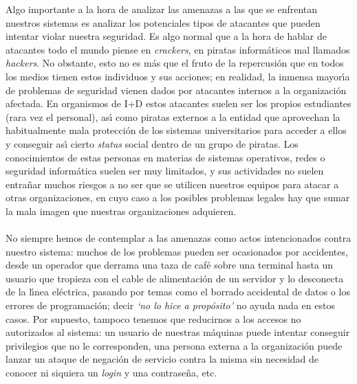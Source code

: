 Algo importante a la hora de analizar las amenazas a las que se enfrentan
nuestros sistemas es analizar los potenciales tipos de atacantes que pueden
intentar violar nuestra seguridad. Es algo normal que a la hora de hablar de
atacantes todo el mundo piense en {\it crackers}, en piratas inform\'aticos mal
llamados {\it hackers}. No obstante, esto no es m\'as que el fruto de la 
repercusi\'on que en todos los medios tienen estos individuos y sus acciones;
en realidad, la inmensa mayor\'{\i}a de problemas de seguridad vienen dados por
atacantes internos a la organizaci\'on afectada. En organismos de I+D estos
atacantes suelen ser los propios estudiantes (rara vez el personal), as\'{\i}
como piratas externos a la entidad que aprovechan la habitualmente mala 
protecci\'on de los sistemas universitarios para acceder a ellos y conseguir
as\'{\i} cierto {\it status} social dentro de un grupo de piratas. Los
conocimientos de estas personas en materias de sistemas operativos, redes o
seguridad inform\'atica suelen ser muy limitados, y sus actividades no suelen
entra\~nar muchos riesgos a no ser que se utilicen nuestros equipos para atacar
a otras organizaciones, en cuyo caso a los posibles problemas legales hay que
sumar la mala imagen que nuestras organizaciones adquieren.\\
\\No siempre hemos de contemplar a las amenazas como actos intencionados contra
nuestro sistema: muchos de los problemas pueden ser ocasionados por accidentes,
desde un operador que derrama una taza de caf\'e sobre una terminal hasta un
usuario que tropieza con el cable de alimentaci\'on de un servidor y lo 
desconecta de la l\'{\i}nea el\'ectrica, pasando por temas como el borrado 
accidental de datos o los errores de programaci\'on; decir {\it `no lo hice a
prop\'osito'} no ayuda nada en estos casos. Por supuesto, tampoco tenemos que
reducirnos a los accesos no autorizados al sistema: un usuario de nuestras
m\'aquinas puede intentar conseguir privilegios que no le corresponden, una
persona externa a la organizaci\'on puede lanzar un ataque de negaci\'on de
servicio contra la misma sin necesidad de conocer ni siquiera un {\it login}
y una contrase\~na, etc.
